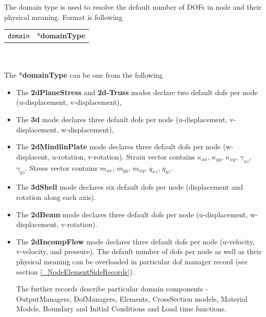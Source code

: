 \documentclass[a4paper]{article}
\makeatletter
\newcommand{\param}[1]{\texttt{#1}} %
\newcommand{\fieldnotype}[1]{\param{#1}}
\newcommand{\entKeyword}[1]{*\textbf{#1}} %
\newcommand{\entKeywordInst}[1]{\textbf{#1}} %
\newenvironment{record}[1][]{\begin{tabular}{|ll}}{\end{tabular}\\}
\newcommand{\recentry}[2]{{#1}&{#2}\\}
\newcounter{rcc}
\newenvironment{record}[1][\textwidth]{\setcounter{rcc}{0}\begin{tabular*}{#1}{|ll@{\extracolsep{\fill}}r}}{\end{tabular*}\\}
\newcommand{\recentry}[2]{\ifthenelse{\value{rcc}>0}{&$\backslash$ \\}{\setcounter{rcc}{1}}{#1}&{#2}}
\makeatother
\begin{document}
The domain type is used to resolve the
default number of DOFs in node and their physical meaning. Format is following\\
\begin{record}
  \recentry{\fieldnotype{domain}}{\entKeyword{domainType}}
\end{record}\\
The \entKeyword{domainType} can be one from the following
\begin{itemize}
\item The \entKeywordInst{2dPlaneStress} and \entKeywordInst{2d-Truss}
modes declare two default dofs per node (u-displacement, v-displacement),
\item The \entKeywordInst{3d} mode declares three default dofs per
node (u-displacement, v-displacement, w-displacement),
\item The \entKeywordInst{2dMindlinPlate} mode declares three default
dofs per node (w-displacent, u-rotation, v-rotation). Strain vector contains
$\kappa_{xx}$, $\kappa_{yy}$, $\kappa_{xy}$, $\gamma_{xz}$, $\gamma_{yz}$. Stress vector
contains $m_{xx}$, $m_{yy}$, $m_{xy}$, $q_{xz}$, $q_{yz}$.

\item The \entKeywordInst{3dShell} mode declares six default dofs
per node (displacement and rotation along each axis).
\item The \entKeywordInst{2dBeam} mode declares three default dofs per
node (u-displacement, w-displacement, v-rotation).
\item The \entKeywordInst{2dIncompFlow} mode declares three default
  dofs per node (u-velocity, v-velocity, and pressure).
The default number of dofs per node as well as their physical meaning
can be overloaded in particular dof manager record (see section
\ref{_NodeElementSideRecords}).

The further records describe particular domain components -
OutputManagers, DofManagers, Elements, CrossSection models, Material
Models, Boundary and Initial Conditions and Load time functions.

\end{itemize}
\end{document}
